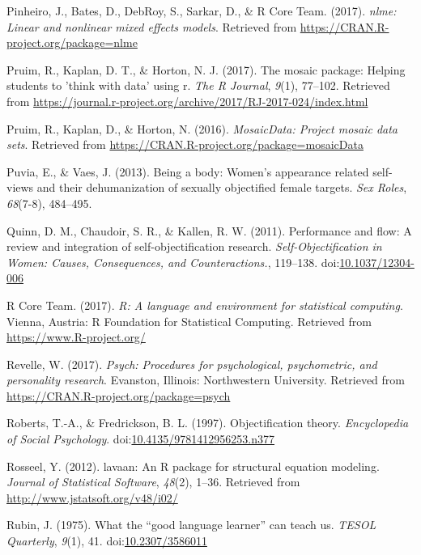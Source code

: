 \documentclass[man]{apa6}
\begin{document}
\hypertarget{ref-R-nlme}{}
Pinheiro, J., Bates, D., DebRoy, S., Sarkar, D., \& R Core Team. (2017).
\emph{nlme: Linear and nonlinear mixed effects models}. Retrieved from
\url{https://CRAN.R-project.org/package=nlme}

\hypertarget{ref-R-mosaic}{}
Pruim, R., Kaplan, D. T., \& Horton, N. J. (2017). The mosaic package:
Helping students to 'think with data' using r. \emph{The R Journal},
\emph{9}(1), 77--102. Retrieved from
\url{https://journal.r-project.org/archive/2017/RJ-2017-024/index.html}

\hypertarget{ref-R-mosaicData}{}
Pruim, R., Kaplan, D., \& Horton, N. (2016). \emph{MosaicData: Project
mosaic data sets}. Retrieved from
\url{https://CRAN.R-project.org/package=mosaicData}

\hypertarget{ref-puvia2013being}{}
Puvia, E., \& Vaes, J. (2013). Being a body: Women's appearance related
self-views and their dehumanization of sexually objectified female
targets. \emph{Sex Roles}, \emph{68}(7-8), 484--495.

\hypertarget{ref-quinnetal}{}
Quinn, D. M., Chaudoir, S. R., \& Kallen, R. W. (2011). Performance and
flow: A review and integration of self-objectification research.
\emph{Self-Objectification in Women: Causes, Consequences, and
Counteractions.}, 119--138.
doi:\href{https://doi.org/10.1037/12304-006}{10.1037/12304-006}

\hypertarget{ref-R-base}{}
R Core Team. (2017). \emph{R: A language and environment for statistical
computing}. Vienna, Austria: R Foundation for Statistical Computing.
Retrieved from \url{https://www.R-project.org/}

\hypertarget{ref-R-psych}{}
Revelle, W. (2017). \emph{Psych: Procedures for psychological,
psychometric, and personality research}. Evanston, Illinois:
Northwestern University. Retrieved from
\url{https://CRAN.R-project.org/package=psych}

\hypertarget{ref-robertsfredrickson}{}
Roberts, T.-A., \& Fredrickson, B. L. (1997). Objectification theory.
\emph{Encyclopedia of Social Psychology}.
doi:\href{https://doi.org/10.4135/9781412956253.n377}{10.4135/9781412956253.n377}

\hypertarget{ref-R-lavaan}{}
Rosseel, Y. (2012). lavaan: An R package for structural equation
modeling. \emph{Journal of Statistical Software}, \emph{48}(2), 1--36.
Retrieved from \url{http://www.jstatsoft.org/v48/i02/}

\hypertarget{ref-rubin1975}{}
Rubin, J. (1975). What the ``good language learner'' can teach us.
\emph{TESOL Quarterly}, \emph{9}(1), 41.
doi:\href{https://doi.org/10.2307/3586011}{10.2307/3586011}
\end{document}
